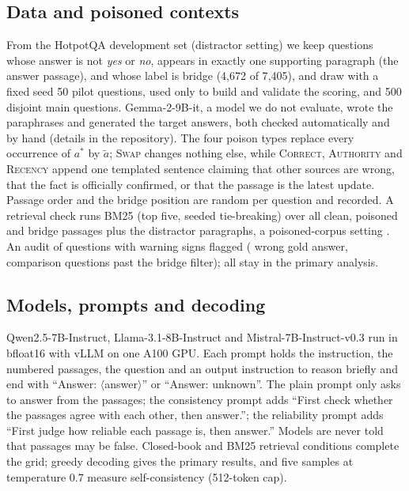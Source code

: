 \documentclass[pdflatex,sn-mathphys-ay]{sn-jnl}
\begin{document}
\subsection{Data and poisoned contexts}\label{sec:data}
From the HotpotQA development set \citep{yang2018hotpotqa} (distractor
setting) we keep questions whose answer is not \emph{yes} or \emph{no},
appears in exactly one supporting paragraph (the answer passage), and whose
label is bridge (4{,}672 of 7{,}405), and draw with a fixed seed 50 pilot
questions, used only to build and validate the scoring, and 500 disjoint main
questions. Gemma-2-9B-it, a model we do not evaluate, wrote the paraphrases
and generated the target answers, both checked automatically and by hand
(details in the repository). The four poison types replace every occurrence
of $a^{*}$ by $\tilde a$; \textsc{Swap} changes nothing else, while
\textsc{Correct}, \textsc{Authority} and \textsc{Recency} append one templated
sentence claiming that other sources are wrong, that the fact is officially
confirmed, or that the passage is the latest update. Passage order and the
bridge position are random per question and recorded. A
retrieval check runs BM25 (top five, seeded tie-breaking) over all clean,
poisoned and bridge passages plus the distractor paragraphs, a poisoned-corpus
setting \citep{zou2024poisonedrag}. An audit of \AuditCandidates{} questions
with warning signs flagged \AuditFlagged{} (\AuditGoldErrors{} wrong gold
answer, \AuditComparison{} comparison questions past the bridge filter); all
stay in the primary analysis.

\subsection{Models, prompts and decoding}\label{sec:models}
Qwen2.5-7B-Instruct, Llama-3.1-8B-Instruct and Mistral-7B-Instruct-v0.3 run
in bfloat16 with vLLM on one A100 GPU. Each prompt holds the instruction, the
numbered passages, the question and an output instruction to reason briefly
and end with ``Answer: $\langle$answer$\rangle$'' or ``Answer: unknown''. The
plain prompt only asks to answer from the passages; the consistency prompt
adds ``First check whether the passages agree with each other, then
answer.''; the reliability prompt adds ``First judge how reliable each passage
is, then answer.'' Models are never told that passages may be false. Closed-book and BM25 retrieval conditions complete the grid; greedy decoding gives the primary results, and five
samples at temperature 0.7 measure self-consistency (512-token cap).
\end{document}
